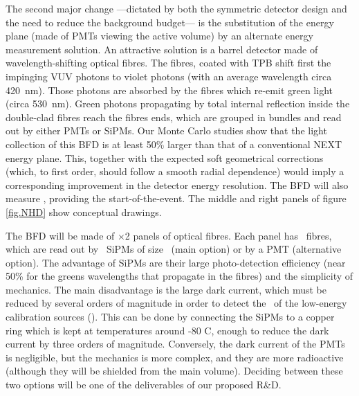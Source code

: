 
The second major change ---dictated by both the symmetric detector design and the need to reduce the background budget--- is the substitution of the energy plane (made of PMTs viewing the active volume) by an alternate energy measurement solution.  An attractive solution is a barrel detector made of wavelength-shifting optical fibres. The fibres, coated with TPB shift first the impinging VUV photons to violet photons (with an average wavelength circa \SI{420}{\nm}). Those photons are absorbed by the fibres which re-emit green light (circa  \SI{530}{\nm}). Green photons propagating by total internal reflection inside the double-clad fibres reach the fibres ends, which are grouped in bundles and read out by either PMTs or SiPMs. Our Monte Carlo studies show that the light collection of this BFD is at least 50\% larger than that of a conventional NEXT energy plane. This, together with the expected soft geometrical corrections (which, to first order, should follow a smooth radial dependence) would imply a corresponding improvement in the detector energy resolution. The BFD will also measure \sone, providing the start-of-the-event.  The middle and right panels of figure \ref{fig.NHD} show conceptual drawings. 



The BFD will be made of \BFDNP$\times$2 panels of optical fibres. Each panel has \BFDNFPP\ fibres, which are read out by \BFDNSIPMPP\ SiPMs
of size \BFDNSIPM\ (main option) or by a PMT (alternative option). The advantage of SiPMs are their large photo-detection efficiency (near 50\% for the greens wavelengths that propagate in the fibres) and the simplicity of mechanics. The main disadvantage is the large dark current, which must be reduced by several orders of magnitude in order to detect the \sone\ of the low-energy calibration sources (). This can be done by connecting the SiPMs to a copper ring which is kept at temperatures around -80 C, enough to reduce the dark current by three orders of magnitude. Conversely, the dark current of the PMTs is negligible, but the mechanics is more complex, and they are more radioactive (although they will be shielded from the main volume). Deciding between these two options will be one of the
deliverables of our proposed R\&D. 



